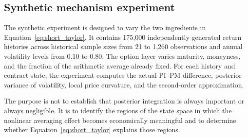 \subsection{Synthetic mechanism experiment}

The synthetic experiment is designed to vary the two ingredients in Equation~\eqref{eq:short_taylor}. It contains 175,000 independently generated return histories across historical sample sizes from 21 to 1,260 observations and annual volatility levels from 0.10 to 0.80. The option layer varies maturity, moneyness, and the fraction of the arithmetic average already fixed. For each history and contract state, the experiment computes the actual PI--PM difference, posterior variance of volatility, local price curvature, and the second-order approximation.

The purpose is not to establish that posterior integration is always important or always negligible. It is to identify the regions of the state space in which the nonlinear averaging effect becomes economically meaningful and to determine whether Equation~\eqref{eq:short_taylor} explains those regions.
